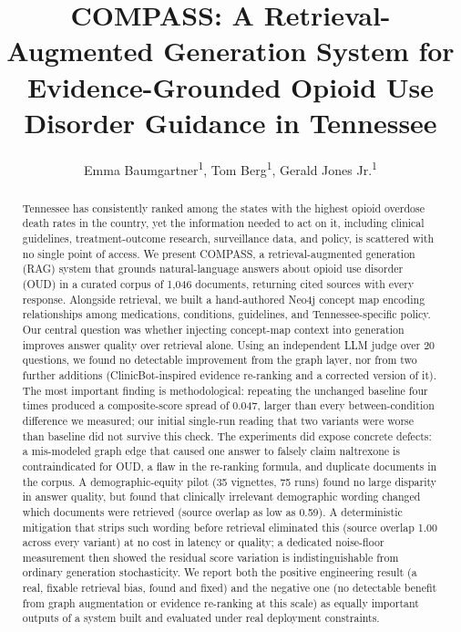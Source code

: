 \documentclass[letterpaper]{article}
\title{COMPASS: A Retrieval-Augmented Generation System for Evidence-Grounded Opioid Use Disorder Guidance in Tennessee}
\author{
    Emma Baumgartner\textsuperscript{\rm 1},
    Tom Berg\textsuperscript{\rm 1},
    Gerald Jones Jr.\textsuperscript{\rm 1}
}
\begin{document}
\maketitle

\begin{abstract}
Tennessee has consistently ranked among the states with the highest opioid overdose death rates in the country, yet the information needed to act on it, including clinical guidelines, treatment-outcome research, surveillance data, and policy, is scattered with no single point of access. We present COMPASS, a retrieval-augmented generation (RAG) system that grounds natural-language answers about opioid use disorder (OUD) in a curated corpus of 1{,}046 documents, returning cited sources with every response. Alongside retrieval, we built a hand-authored Neo4j concept map encoding relationships among medications, conditions, guidelines, and Tennessee-specific policy. Our central question was whether injecting concept-map context into generation improves answer quality over retrieval alone. Using an independent LLM judge over 20 questions, we found no detectable improvement from the graph layer, nor from two further additions (ClinicBot-inspired evidence re-ranking and a corrected version of it). The most important finding is methodological: repeating the unchanged baseline four times produced a composite-score spread of 0.047, larger than every between-condition difference we measured; our initial single-run reading that two variants were worse than baseline did not survive this check. The experiments did expose concrete defects: a mis-modeled graph edge that caused one answer to falsely claim naltrexone is contraindicated for OUD, a flaw in the re-ranking formula, and duplicate documents in the corpus. A demographic-equity pilot (35 vignettes, 75 runs) found no large disparity in answer quality, but found that clinically irrelevant demographic wording changed which documents were retrieved (source overlap as low as 0.59). A deterministic mitigation that strips such wording before retrieval eliminated this (source overlap 1.00 across every variant) at no cost in latency or quality; a dedicated noise-floor measurement then showed the residual score variation is indistinguishable from ordinary generation stochasticity. We report both the positive engineering result (a real, fixable retrieval bias, found and fixed) and the negative one (no detectable benefit from graph augmentation or evidence re-ranking at this scale) as equally important outputs of a system built and evaluated under real deployment constraints.
\end{abstract}
\end{document}
